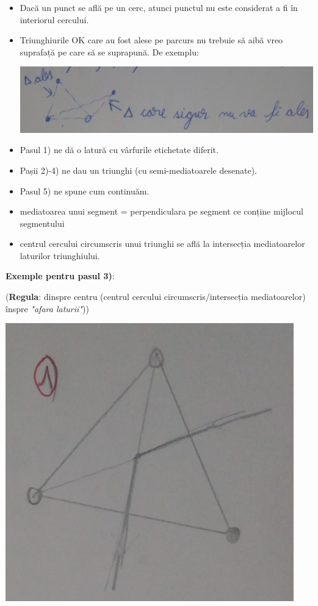 \documentclass[12pt]{article}
\begin{document}
	\begin{itemize}
		\item Dacă un punct se află pe un cerc, atunci punctul nu este considerat a fi în interiorul cercului.
		\item Triunghiurile OK care au fost alese pe parcurs nu trebuie să aibă vreo suprafață pe care să se suprapună.
		De exemplu:

		\begin{center}
			\includegraphics[width=1\linewidth]{screenshot009}
		\end{center}

		\item Pasul 1) ne dă o latură cu vârfurile etichetate diferit.
		\item Pașii 2)-4) ne dau un triunghi (cu semi-mediatoarele desenate).
		\item Pasul 5) ne spune cum continuăm.
		\item mediatoarea unui segment = perpendiculara pe segment ce conține mijlocul segmentului
		\item centrul cercului circumscris unui triunghi se află la intersecția mediatoarelor laturilor triunghiului.
	\end{itemize}
	
	\textbf{Exemple pentru pasul 3)}:
	
	(\textbf{Regula}: dinspre centru (centrul cercului circumscris/intersecția mediatoarelor) înspre \textit{"afara laturii"}))
	
	\begin{center}
		\includegraphics{screenshot010}
	\end{center}
	
\end{document}
